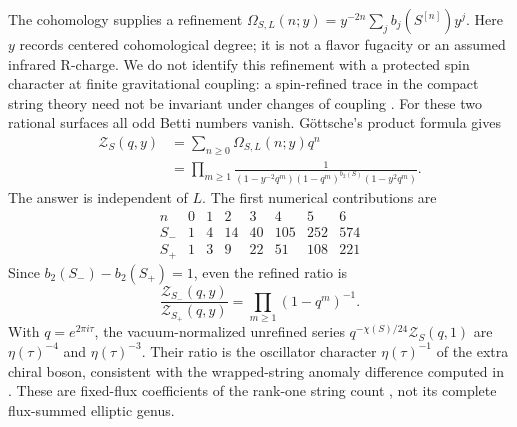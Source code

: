 The cohomology supplies a refinement
$\Omega_{S,L}(n;y)=y^{-2n}\sum_j b_j(S^{[n]})y^j$.
Here $y$ records centered cohomological degree; it is not a flavor
fugacity or an assumed infrared R-charge. We do not identify this
refinement with a protected spin character at finite gravitational
coupling: a spin-refined trace in the compact string theory need not
be invariant under changes of coupling
\cite[Section~2.6]{Manschot:2011Halos}. For these two rational
surfaces all odd Betti numbers vanish. G\"ottsche's product formula
\cite[eq.~(2.1)]{Gottsche:2003Hilbert} gives
\begin{equation}
 \begin{aligned}
 \mathcal Z_S(q,y)&=\sum_{n\geq0}\Omega_{S,L}(n;y)q^n\\
 &=\prod_{m\geq1}
 \frac{1}{(1-y^{-2}q^m)(1-q^m)^{b_2(S)}(1-y^2q^m)}.
 \end{aligned}
 \label{eq:x9-supported-refined}
\end{equation}
The answer is independent of $L$. The first numerical contributions are
\begin{equation}
 \begin{array}{c|rrrrrrr}
 n&0&1&2&3&4&5&6\\\hline
 S_-&1&4&14&40&105&252&574\\
 S_+&1&3&9&22&51&108&221
 \end{array}
 \label{eq:x9-supported-counts}
\end{equation}
Since $b_2(S_-)-b_2(S_+)=1$, even the refined ratio is
\begin{equation}
 \frac{\mathcal Z_{S_-}(q,y)}{\mathcal Z_{S_+}(q,y)}
 =\prod_{m\geq1}(1-q^m)^{-1}.
 \label{eq:x9-supported-blowup}
\end{equation}
With $q=e^{2\pi i\tau}$, the vacuum-normalized unrefined series
$q^{-\chi(S)/24}\mathcal Z_S(q,1)$ are $\eta(\tau)^{-4}$ and
$\eta(\tau)^{-3}$. Their ratio is the oscillator character
$\eta(\tau)^{-1}$ of the extra chiral boson, consistent with the wrapped-string anomaly difference
computed in \cite{Wuebben:2026quantum}. These are fixed-flux coefficients
of the rank-one string count \cite[Section~2.1]{Alim:2010M5}, not its
complete flux-summed elliptic genus.

